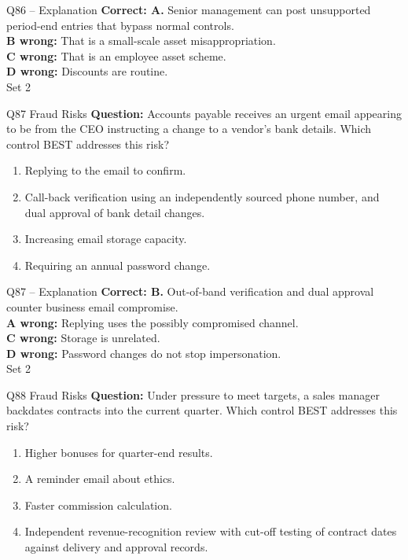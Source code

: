 \documentclass[aspectratio=169,10pt]{beamer}
\begin{document}
\begin{frame}[t]{Q86 -- Explanation}
	\footnotesize
	\textbf{Correct: A.} Senior management can post unsupported period-end entries that bypass normal controls. \\[5pt]
\textbf{B wrong:} That is a small-scale asset misappropriation. \\[3pt]
\textbf{C wrong:} That is an employee asset scheme. \\[3pt]
\textbf{D wrong:} Discounts are routine. \\[3pt]
	\vfill {\tiny Set 2}
\end{frame}

\begin{frame}[t]{Q87 \hfill {\scriptsize Fraud Risks}}
	\small
	\textbf{Question:} Accounts payable receives an urgent email appearing to be from the CEO instructing a change to a vendor's bank details. Which control BEST addresses this risk?
	\begin{enumerate}[label=\Alph*.,itemsep=1pt,topsep=3pt]
			\item Replying to the email to confirm.
			\item Call-back verification using an independently sourced phone number, and dual approval of bank detail changes.
			\item Increasing email storage capacity.
			\item Requiring an annual password change.
	\end{enumerate}
\end{frame}

\begin{frame}[t]{Q87 -- Explanation}
	\footnotesize
	\textbf{Correct: B.} Out-of-band verification and dual approval counter business email compromise. \\[5pt]
\textbf{A wrong:} Replying uses the possibly compromised channel. \\[3pt]
\textbf{C wrong:} Storage is unrelated. \\[3pt]
\textbf{D wrong:} Password changes do not stop impersonation. \\[3pt]
	\vfill {\tiny Set 2}
\end{frame}

\begin{frame}[t]{Q88 \hfill {\scriptsize Fraud Risks}}
	\small
	\textbf{Question:} Under pressure to meet targets, a sales manager backdates contracts into the current quarter. Which control BEST addresses this risk?
	\begin{enumerate}[label=\Alph*.,itemsep=1pt,topsep=3pt]
			\item Higher bonuses for quarter-end results.
			\item A reminder email about ethics.
			\item Faster commission calculation.
			\item Independent revenue-recognition review with cut-off testing of contract dates against delivery and approval records.
	\end{enumerate}
\end{frame}
\end{document}

